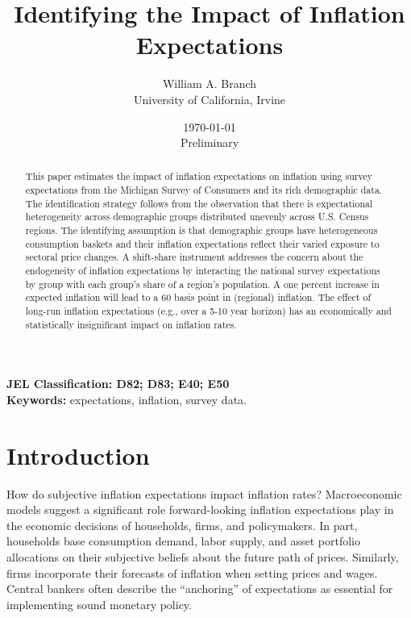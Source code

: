 \documentclass[12pt]{article}
\begin{document}
\title{\vspace{-1 in} Identifying the Impact of Inflation Expectations}
\author{William A. Branch \\
University of California, Irvine }
\date{\today\\ Preliminary}
\maketitle
\vspace{-0.45in}

\begin{abstract}

This paper estimates the impact of inflation expectations on inflation using survey expectations from the Michigan Survey of Consumers and its rich demographic data. The identification strategy follows from the observation that there is expectational heterogeneity across demographic groups distributed unevenly across U.S. Census regions. The identifying assumption is that demographic groups have heterogeneous consumption baskets and their inflation expectations reflect their varied exposure to sectoral price changes. A shift-share instrument addresses the concern about the endogeneity of inflation expectations by interacting the national survey expectations by group with each group's share of a region's population. A one percent increase in expected inflation will lead to a 60 basis point in (regional) inflation. The effect of long-run inflation expectations (e.g., over a 5-10 year horizon) has an economically and statistically insignificant impact on inflation rates.
\end{abstract}

\textbf{JEL Classification: D82; D83; E40; E50}\\

\textbf{Keywords:} expectations, inflation, survey data.

\section{Introduction}

How do subjective inflation expectations impact inflation rates? Macroeconomic models suggest a significant role forward-looking inflation expectations play in the economic decisions of households, firms, and policymakers. In part, households base consumption demand, labor supply, and asset portfolio allocations on their subjective beliefs about the future path of prices. Similarly, firms incorporate their forecasts of inflation when setting prices and wages. Central bankers often describe the ``anchoring'' of expectations as essential for implementing sound monetary policy.  
\end{document}
